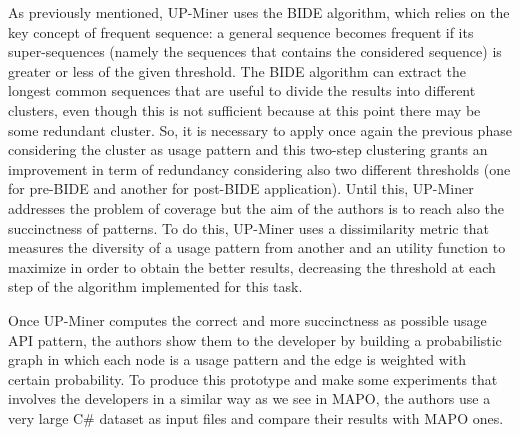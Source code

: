 As previously mentioned, UP-Miner uses the 
BIDE algorithm, which relies on the 
key concept of frequent sequence: a general 
sequence becomes frequent if its 
super-sequences (namely the sequences that 
contains the considered sequence) is 
greater or less of the given threshold. The 
BIDE algorithm can extract the 
longest common sequences that are useful to 
divide the results into different 
clusters, even though this is not 
sufficient because at this point there may 
be 
some redundant cluster. So, it is necessary 
to apply once again the previous 
phase considering the cluster as usage 
pattern and this two-step clustering 
grants an improvement in term of redundancy 
considering also two different 
thresholds (one for pre-BIDE and another 
for post-BIDE application). Until 
this, UP-Miner addresses the problem of 
coverage but the aim of the authors is 
to reach also the succinctness of patterns. 
To do this, UP-Miner uses a 
dissimilarity metric that measures the 
diversity of a usage pattern from 
another and an utility function to maximize 
in order to obtain the better 
results, decreasing the threshold at each 
step of the algorithm implemented for 
this task.

Once UP-Miner computes the correct and more succinctness as possible usage API pattern, the authors show them to the developer by building a probabilistic graph in which each node is a usage pattern and the edge is weighted with certain probability. To produce this prototype and make some experiments that involves the developers in a similar way as we see in MAPO, the authors use a very large C\# dataset as input files and compare their results with MAPO ones.

 


